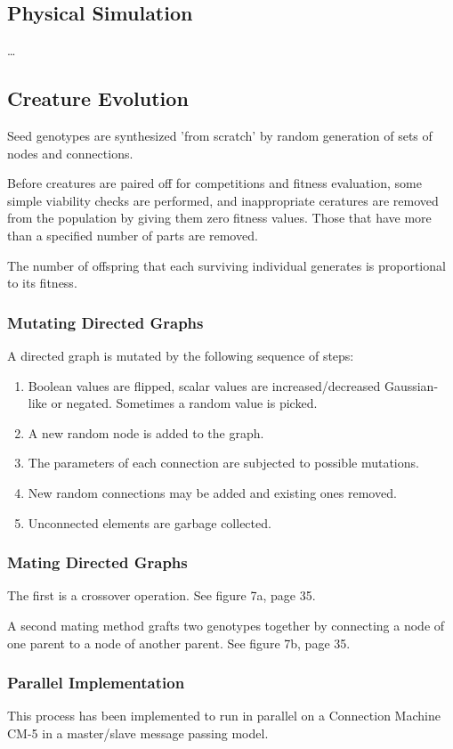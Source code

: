 \documentclass[12pt]{article}
\begin{document}
\subsection{Physical Simulation}
\dots

\subsection{Creature Evolution}
Seed genotypes are synthesized 'from scratch' by random generation of sets of nodes and connections.

Before creatures are paired off for competitions and fitness evaluation, some simple viability checks are performed, and inappropriate ceratures are removed from the population by giving them zero fitness values. Those that have more than a specified number of parts are removed.

The number of offspring that each surviving individual generates is proportional to its fitness.

\subsubsection{Mutating Directed Graphs}
A directed graph is mutated by the following sequence of steps:
\begin{enumerate}
\item Boolean values are flipped, scalar values are increased/decreased Gaussian-like or negated. Sometimes a random value is picked.
\item A new random node is added to the graph.
\item The parameters of each connection are subjected to possible mutations.
\item New random connections may be added and existing ones removed.
\item Unconnected elements are garbage collected.
\end{enumerate}

\subsubsection{Mating Directed Graphs}
The first is a crossover operation. See figure 7a, page 35.

A second mating method grafts two genotypes together by connecting a node of one parent to a node of another parent. See figure 7b, page 35.

\subsubsection{Parallel Implementation}
This process has been implemented to run in parallel on a Connection Machine CM-5 in a master/slave message passing model.
\end{document}
